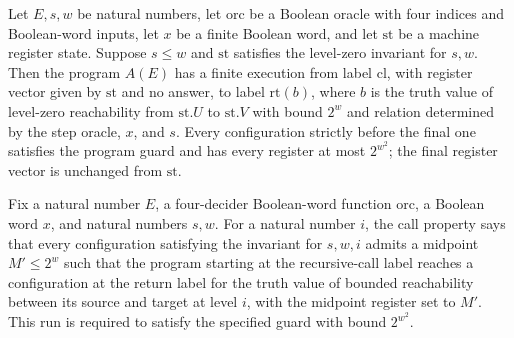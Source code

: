 \begin{theorem}
\label{Complexity.LogProg.SavitchARM.base_spec}
\leanok
{}
Let $E,s,w$ be natural numbers, let $\mathrm{orc}$ be a Boolean oracle with four indices and
Boolean-word inputs, let $x$ be a finite Boolean word, and let $\mathrm{st}$ be a machine
register state. Suppose $s\le w$ and $\mathrm{st}$ satisfies the level-zero invariant for
$s,w$. Then the program $A(E)$ has a finite execution from label $\mathrm{cl}$, with register
vector given by $\mathrm{st}$ and no answer, to label $\mathrm{rt}(b)$, where $b$ is the truth value
of level-zero reachability from $\mathrm{st}.U$ to $\mathrm{st}.V$ with bound $2^w$ and relation
determined by the step oracle, $x$, and $s$. Every configuration strictly before the
final one satisfies the program guard and has every register at most $2^{w^2}$; the
final register vector is unchanged from $\mathrm{st}$.
\end{theorem}

\begin{definition}
\label{Complexity.LogProg.SavitchARM.CallOK}
\leanok
{}
Fix a natural number $E$, a four-decider Boolean-word function $\mathrm{orc}$, a Boolean
word $x$, and natural numbers $s,w$. For a natural number $i$, the call property says
that every configuration satisfying the invariant for $s,w,i$ admits a midpoint $M'\le
2^w$ such that the program starting at the recursive-call label reaches a configuration
at the return label for the truth value of bounded reachability between its source and
target at level $i$, with the midpoint register set to $M'$. This run is required to
satisfy the specified guard with bound $2^{w^2}$.
\end{definition}

